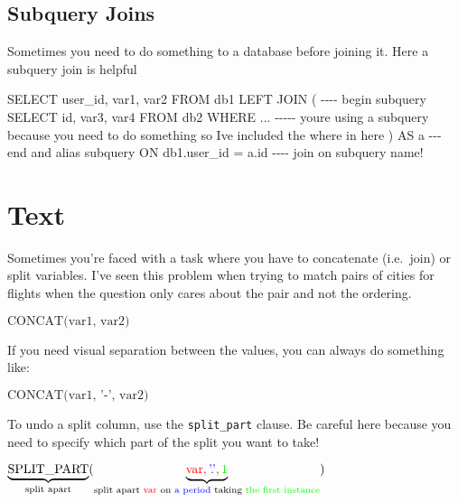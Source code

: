 \documentclass[
  letterpaper,
  DIV=11,
  numbers=noendperiod]{scrreprt}
\newenvironment{Shaded}{\begin{snugshade}}{\end{snugshade}}
\newcommand{\CommentTok}[1]{\textcolor[rgb]{0.37,0.37,0.37}{#1}}
\newcommand{\KeywordTok}[1]{\textcolor[rgb]{0.00,0.23,0.31}{#1}}
\newcommand{\NormalTok}[1]{\textcolor[rgb]{0.00,0.23,0.31}{#1}}
\newcommand{\OperatorTok}[1]{\textcolor[rgb]{0.37,0.37,0.37}{#1}}
\begin{document}
\hypertarget{subquery-joins}{%
\subsection{Subquery Joins}\label{subquery-joins}}

Sometimes you need to do something to a database before joining it. Here
a subquery join is helpful

\begin{Shaded}
\begin{Highlighting}[]
\KeywordTok{SELECT}\NormalTok{ user\_id, var1, var2 }
\KeywordTok{FROM}\NormalTok{  db1}
\KeywordTok{LEFT} \KeywordTok{JOIN} 
\NormalTok{    ( }\CommentTok{{-}{-}{-}{-} begin subquery }
        \KeywordTok{SELECT} \KeywordTok{id}\NormalTok{, var3, var4}
        \KeywordTok{FROM}\NormalTok{ db2}
        \KeywordTok{WHERE} \OperatorTok{..}\NormalTok{. }\CommentTok{{-}{-}{-}{-}{-}  you\textquotesingle{}re using a subquery because you need to do something so I\textquotesingle{}ve included the where in here }
\NormalTok{    ) }\KeywordTok{AS}\NormalTok{ a }\CommentTok{{-}{-}{-} end and alias subquery }
\KeywordTok{ON}\NormalTok{ db1.user\_id }\OperatorTok{=}\NormalTok{ a.}\KeywordTok{id} \CommentTok{{-}{-}{-}{-} join on subquery name!}
\end{Highlighting}
\end{Shaded}

\hypertarget{sec-text}{%
\section{Text}\label{sec-text}}

Sometimes you're faced with a task where you have to concatenate
(i.e.~join) or split variables. I've seen this problem when trying to
match pairs of cities for flights when the question only cares about the
pair and not the ordering.

\(\text{CONCAT(var1, var2)}\)

If you need visual separation between the values, you can always do
something like:

\(\text{CONCAT(var1, '-', var2)}\)

To undo a split column, use the \texttt{split\_part} clause. Be careful
here because you need to specify which part of the split you want to
take!

\(\underbrace{\text{SPLIT\_PART}}_{\text{split apart}}(\underbrace{{\color{red}{\text{var}}, {\color{blue}{\text{'.'}}}, {\color{green}{\text{1}}}}}_{\text{split apart}{\color{red}{\text{ var}}} \text{ on}{\color{blue}{\text{ a period}}} \text{ taking }{\color{green}{\text{the first instance}}} })\)
\end{document}
